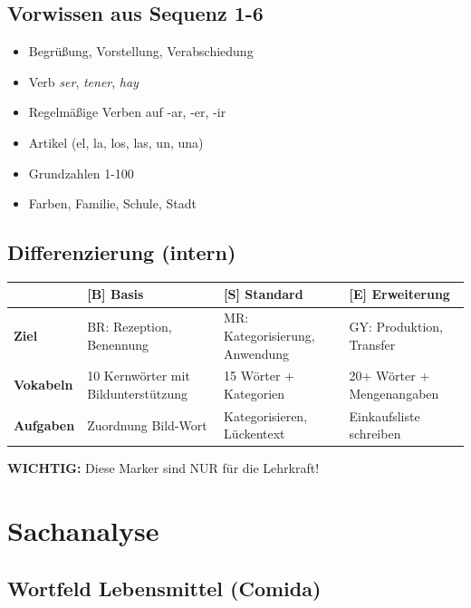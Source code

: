 \documentclass[11pt,a4paper]{article}
\newcommand{\B}{\textcolor{basis}{\textbf{[B]}}}
\newcommand{\Std}{\textcolor{standard}{\textbf{[S]}}}
\newcommand{\E}{\textcolor{erweiterung}{\textbf{[E]}}}
\begin{document}
\subsection{Vorwissen aus Sequenz 1-6}
\begin{itemize}
    \item Begrüßung, Vorstellung, Verabschiedung
    \item Verb \textit{ser}, \textit{tener}, \textit{hay}
    \item Regelmäßige Verben auf -ar, -er, -ir
    \item Artikel (el, la, los, las, un, una)
    \item Grundzahlen 1-100
    \item Farben, Familie, Schule, Stadt
\end{itemize}

\subsection{Differenzierung (intern)}
\begin{tabular}{|l|p{3.5cm}|p{3.5cm}|p{3.5cm}|}
\hline
& \B{} \textbf{Basis} & \Std{} \textbf{Standard} & \E{} \textbf{Erweiterung} \\
\hline
\textbf{Ziel} & BR: Rezeption, Benennung & MR: Kategorisierung, Anwendung & GY: Produktion, Transfer \\
\hline
\textbf{Vokabeln} & 10 Kernwörter mit Bildunterstützung & 15 Wörter + Kategorien & 20+ Wörter + Mengenangaben \\
\hline
\textbf{Aufgaben} & Zuordnung Bild-Wort & Kategorisieren, Lückentext & Einkaufsliste schreiben \\
\hline
\end{tabular}

\vspace{0.5em}
\textbf{WICHTIG:} Diese Marker sind NUR für die Lehrkraft!

\section{Sachanalyse}

\subsection{Wortfeld Lebensmittel (Comida)}
\end{document}
